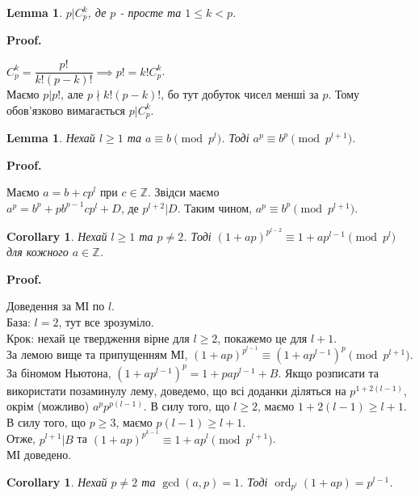 \documentclass[a4paper, 14pt]{extarticle}
\makeatletter
\theoremstyle{theoremdd}
\theoremstyle{theoremdd}
\theoremstyle{theoremdd}
\theoremstyle{theoremdd}
\theoremstyle{theoremdd}
\theoremstyle{theoremdd}
\theoremstyle{theoremdd}
\newtheorem{lemma}[theorem]{Lemma}
\theoremstyle{theoremdd}
\newtheorem{corollary}[theorem]{Corollary}
\def\qed{$\blacksquare$}
\renewenvironment{proof}[1][Proof.\\]{\par
\pushQED{\hfill \qed}%
\normalfont \topsep6\p@\@plus6\p@\relax
\trivlist
\item\relax
{\bfseries
#1\@addpunct{.}}\hspace\labelsep\ignorespaces
}{%
\popQED\endtrivlist\@endpefalse
}
\DeclareMathOperator{\ord}{ord}
\makeatother
\begin{document}
\iffalse
\begin{lemma}
$p | C_p^k$, де $p$ - просте та $1 \leq k < p$.
\end{lemma}

\begin{proof}
$C_p^k = \dfrac{p!}{k!(p-k)!} \implies p! = k! C_p^k$.\\
Маємо $p | p!$, але $p \nmid k!(p-k)!$, бо тут добуток чисел менші за $p$. Тому обов'язково вимагається $p | C_p^k$.
\end{proof}

\begin{lemma}
Нехай $l \geq 1$ та $a \equiv b \pmod {p^l}$. Тоді $a^p \equiv b^p \pmod {p^{l+1}}$.
\end{lemma}

\begin{proof}
Маємо $a = b + cp^l$ при $c \in \mathbb{Z}$. Звідси маємо\\
$a^p = b^p + p b^{p-1}cp^l + D$, де $p^{l+2} | D$. Таким чином, $a^p \equiv b^p \pmod {p^{l+1}}$.
\end{proof}

\begin{corollary}
Нехай $l \geq 1$ та $p \neq 2$. Тоді $(1+ap)^{p^{l-2}} \equiv 1 + ap^{l-1} \pmod {p^l}$ для кожного $a \in \mathbb{Z}$.
\end{corollary}

\begin{proof}
Доведення за МІ по $l$.\\
База: $l = 2$, тут все зрозуміло.\\
Крок: нехай це твердження вірне для $l \geq 2$, покажемо це для $l+1$.\\
За лемою вище та припущенням МІ, $(1+ap)^{p^{l-1}} \equiv (1+ap^{l-1})^p \pmod {p^{l+1}}$.\\
За біномом Ньютона, $(1+ap^{l-1})^p = 1 + p a p^{l-1} + B$. Якщо розписати та використати позаминулу лему, доведемо, що всі доданки діляться на $p^{1+2(l-1)}$, окрім (можливо) $a^pp^{p(l-1)}$. В силу того, що $l \geq 2$, маємо $1 + 2(l-1) \geq l +1$. В силу того, що $p \geq 3$, маємо $p(l-1) \geq l+1$.\\
Отже, $p^{l+1} | B$ та $(1+ap)^{p^{k-1}} \equiv 1 + ap^l \pmod {p^{l+1}}$.\\
МІ доведено.
\end{proof}

\begin{corollary}
Нехай $p \neq 2$ та $\gcd(a,p) = 1$. Тоді $\ord_{p^l} (1+ap) = p^{l-1}$.
\end{corollary}
\end{document}
